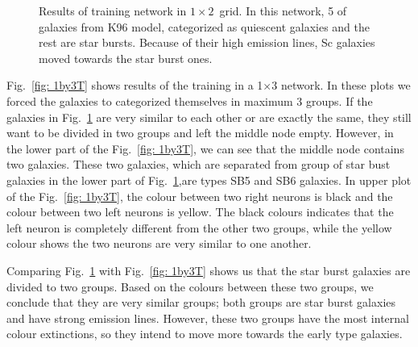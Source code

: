 \begin{figure}
\begin{subfigure}[b]{0.5\textwidth}
                \end{subfigure}
                \caption{Results of training network in $1\times2$~grid. In this network, 5 of galaxies from K96 model, categorized as quiescent galaxies and the rest are star bursts. Because of their high emission lines, Sc galaxies moved towards the star burst ones.}
                 \label{fig: 1by2T}
            \end{figure}
        
            Fig.~\ref{fig: 1by3T} shows results of the training in a 1$\times$3 network.
            In these plots we forced the galaxies to categorized themselves in maximum 3 groups. 
            If the galaxies in Fig.~\ref{fig: 1by2T} are very similar to each other or are exactly the same, they still want to be divided in two groups and left the middle node empty. 
            However, in the lower part of the Fig.~\ref{fig: 1by3T}, we can see that the middle node contains two galaxies.
            These two galaxies, which are separated from group of star bust galaxies in the lower part of Fig.~\ref{fig: 1by2T},are types SB5 and SB6 galaxies.
            In upper plot of the Fig.~\ref{fig: 1by3T}, the colour between two right neurons is black and the colour between two left neurons is yellow. 
            The black colours indicates that the left neuron is completely different from the other two groups, while the yellow colour shows the two neurons are very similar to one another. 
            
            Comparing Fig.~\ref{fig: 1by2T} with Fig.~\ref{fig: 1by3T} shows us that the star burst galaxies are divided to two groups. 
            Based on the colours between these two groups, we conclude that they are very similar groups; both groups are star burst galaxies and have strong emission lines.
            However, these two groups have the most internal colour extinctions, so they intend to move more towards the early type galaxies.
                
